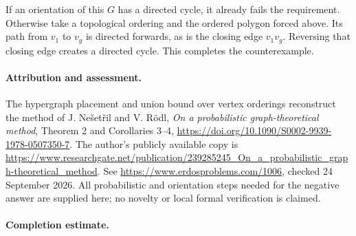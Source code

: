 If an orientation of this \(G\) has a directed cycle, it already fails the requirement. Otherwise take a topological ordering and the ordered polygon forced above. Its path from \(v_1\) to \(v_g\) is directed forwards, as is the closing edge \(v_1v_g\). Reversing that closing edge creates a directed cycle. This completes the counterexample.

\paragraph{Attribution and assessment.}
The hypergraph placement and union bound over vertex orderings reconstruct the method of J. Ne\v{s}et\v{r}il and V. R\"odl, \emph{On a probabilistic graph-theoretical method}, Theorem 2 and Corollaries 3--4, \url{https://doi.org/10.1090/S0002-9939-1978-0507350-7}. The author's publicly available copy is \url{https://www.researchgate.net/publication/239285245_On_a_probabilistic_graph-theoretical_method}. See \url{https://www.erdosproblems.com/1006}, checked 24 September 2026. All probabilistic and orientation steps needed for the negative answer are supplied here; no novelty or local formal verification is claimed.

\paragraph{Completion estimate.}
